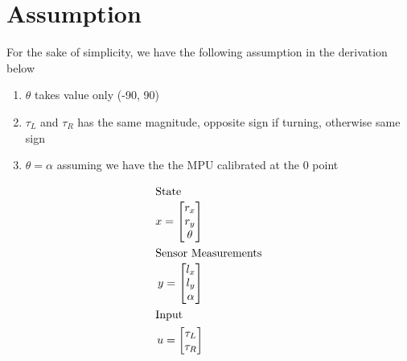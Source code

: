 \documentclass[12pt, letterpaper]{amsart} %
\numberwithin{equation}{section}
\begin{document}
\newpage
\section{Assumption}
For the sake of simplicity, we have the following assumption in the derivation below
\begin{enumerate}
\item $\theta$ takes value only (-90, 90)
\item $\tau_L$ and $\tau_R$ has the same magnitude, opposite sign if turning, otherwise same sign 
\item $\theta = \alpha$ assuming we have the the MPU calibrated at the 0 point
\end{enumerate}  



\begin{align*}
  \intertext{State}
  x = 
  \begin{bmatrix}
    r_x \\
    r_y \\
    \theta 
  \end{bmatrix} \\
  \intertext{Sensor Measurements}
  y = 
  \begin{bmatrix}
    l_x \\
    l_y \\
    \alpha
  \end{bmatrix} \\
  \intertext{Input}
  u = 
  \begin{bmatrix}
    \tau_L \\
    \tau_R
  \end{bmatrix} \\  
\end{align*}
\end{document}
